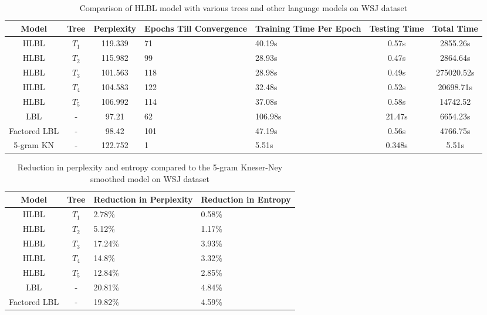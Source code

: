 \begin{table*} \centering
{}
\begin{tabular}{@{}cccC{2cm}C{2cm}cc@{}}\toprule
Model & Tree & Perplexity & Epochs Till Convergence & Training Time Per Epoch & Testing Time & Total Time\\ 
\midrule
 HLBL & $T_1$ &119.339 & 71& 40.19s & 0.57s& 2855.26s\\
 HLBL & $T_2$ &115.982 & 99& 28.93s & 0.47s & 2864.64s\\
 HLBL & $T_3$ &101.563 & 118& 28.98s & 0.49s & 275020.52s \\
 HLBL & $T_4$ &104.583 & 122& 32.48s & 0.52s & 20698.71s\\
 HLBL & $T_5$ &106.992 & 114& 37.08s & 0.58s& 14742.52\\
 LBL& - &97.21 &62 &106.98s & 21.47s& 6654.23s\\
 Factored LBL & - &98.42&101 & 47.19s & 0.56s & 4766.75s \\
 5-gram KN & - &122.752& 1 & 5.51s & 0.348s & 5.51s\\
\bottomrule
\end{tabular}
\caption{Comparison of HLBL model with various trees and other language models on WSJ dataset}
\label{tab:languageModelComparison}
\end{table*}

\begin{table*} \centering
{}
\begin{tabular}{@{}ccC{2cm}C{2cm}@{}}\toprule
Model & Tree & Reduction in Perplexity & Reduction in Entropy \\
\midrule
 HLBL & $T_1$ &2.78\% & 0.58\%\\
 HLBL & $T_2$ &5.12\% & 1.17\% \\
 HLBL & $T_3$ &17.24\% & 3.93\%  \\
 HLBL & $T_4$ &14.8\% & 3.32\%\\
 HLBL & $T_5$ &12.84\% & 2.85\%\\
 LBL& - & 20.81\% &4.84\%\\
 Factored LBL & - &19.82\%&4.59\% \\
\bottomrule
\end{tabular}
\caption{Reduction in perplexity and entropy compared to the 5-gram Kneser-Ney smoothed model on WSJ dataset}
\label{tab:reductionPerplexity}
\end{table*}

